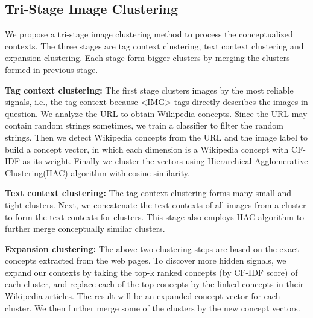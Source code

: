 %
\subsection{Tri-Stage Image Clustering}
We propose a tri-stage image clustering method to process the conceptualized
contexts. The three stages are tag context clustering, 
text context clustering and expansion clustering. 
Each stage form bigger clusters by merging the clusters formed in
previous stage. 

\textbf{Tag context clustering:}
The first stage clusters images by the most reliable signals, i.e., the
tag context because <IMG> tags directly describes the images in question.
We analyze the URL to obtain
Wikipedia concepts. Since the URL may contain random strings sometimes, 
we train a classifier to filter the random strings. 
Then we detect Wikipedia concepts from the URL and the image
label to build a concept vector, in which each dimension is a Wikipedia concept with CF-IDF as its weight. Finally we cluster the vectors using
Hierarchical Agglomerative Clustering(HAC) algorithm with cosine similarity.

\textbf{Text context clustering:}
The tag context clustering forms many small and tight clusters.
Next, we concatenate the text contexts of all images from a cluster 
to form the text contexts for clusters. This stage also
employs HAC algorithm to further merge conceptually similar clusters.

\textbf{Expansion clustering:}
The above two clustering steps are based on the exact concepts extracted
from the web pages. To discover more hidden signals, we 
expand our contexts by taking the top-k ranked concepts (by CF-IDF score) 
of each cluster, and replace each of the top concepts by the  
linked concepts in their Wikipedia articles. The result will be an 
expanded concept vector for each cluster. 
We then further merge some of the clusters by the new concept vectors.

